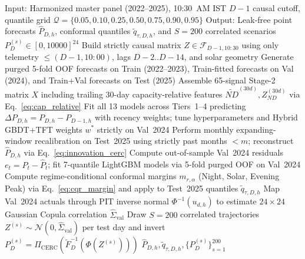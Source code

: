 \documentclass[runningheads,a4paper]{llncs}
\begin{document}
\begin{algorithm}[!t]
\caption{Strict D-1 Causal Stage-1 Exogenous Reconstruction, Multi-Tier Training, and Residual-CQR Scenario Generation}
\label{alg:causal_pipeline}
\footnotesize
\begin{algorithmic}[1]
\State Input: Harmonized master panel (2022--2025), 10:30~AM IST $D-1$ causal cutoff, quantile grid $\mathcal{Q} = \{0.05, 0.10, 0.25, 0.50, 0.75, 0.90, 0.95\}$
\State Output: Leak-free point forecasts $\hat{P}_{D,h}$, conformal quantiles $\tilde{q}_{\tau, D, h}$, and $S=200$ correlated scenarios $P_D^{(s)} \in [0, 10000]^{24}$
    \State Build strictly causal matrix $Z \in \mathcal{F}_{D-1, 10:30}$ using only telemetry $\le (D-1, 10:00)$, lags $D-2..D-14$, and solar geometry
    \State Generate purged 5-fold OOF forecasts on Train (2022--2023), Train-fitted forecasts on Val (2024), and Train+Val forecasts on Test (2025)
\EndFor
\State Assemble 65-signal Stage-2 matrix $X$ including trailing 30-day capacity-relative features $\widetilde{ND}^{(30d)}, Z_{ND}^{(30d)}$ via Eq.~\ref{eq:cap_relative}
\State Fit all 13 models across Tiers~1--4 predicting $\Delta P_{D,h} = P_{D,h} - P_{D-1,h}$ with recency weights; tune hyperparameters and Hybrid GBDT+TFT weights $w^*$ strictly on Val~2024
\State Perform monthly expanding-window recalibration on Test~2025 using strictly past months $< m$; reconstruct $\hat{P}_{D,h}$ via Eq.~\ref{eq:innovation_cerc}
\State Compute out-of-sample Val~2024 residuals $e_t = P_t - \hat{P}_t$; fit 7-quantile LightGBM models via 5-fold purged OOF on Val~2024
\State Compute regime-conditional conformal margins $m_{r, \alpha}$ (Night, Solar, Evening Peak) via Eq.~\ref{eq:cqr_margin} and apply to Test~2025 quantiles $\tilde{q}_{\tau, D, h}$
\State Map Val~2024 actuals through PIT inverse normal $\Phi^{-1}(u_{d,h})$ to estimate $24 \times 24$ Gaussian Copula correlation $\hat{\Sigma}_{\text{val}}$
\State Draw $S=200$ correlated trajectories $Z^{(s)} \sim \mathcal{N}(0, \hat{\Sigma}_{\text{val}})$ per test day and invert $P_D^{(s)} = \Pi_{\text{CERC}}(\tilde{F}_{D}^{-1}(\Phi(Z^{(s)})))$
\State \Return $\hat{P}_{D,h}, \tilde{q}_{\tau, D, h}, \{P_D^{(s)}\}_{s=1}^{200}$
\end{algorithmic}
\end{algorithm}
\end{document}
